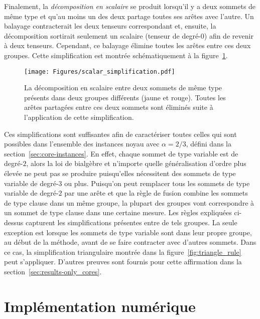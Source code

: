 Finalement, la \emph{décomposition en scalaire} se produit lorsqu'il y a deux sommets de même type et qu'au moins un des deux partage toutes ses arêtes avec l'autre.
Un balayage contracterait les deux tenseurs correspondant et, ensuite, la décomposition sortirait seulement un scalaire (tenseur de degré-$0$) afin de revenir à deux tenseurs.
Cependant, ce balayage élimine toutes les arêtes entre ces deux groupes.
Cette simplification est montrée schématiquement à la figure~\ref{fig:scalar-decomposition}.
\begin{figure}[h]
    \centering
    \texttt{[image: Figures/scalar\_simplification.pdf]}
    \caption[Représentation graphique de la décomposition en scalaire entre deux sommets de même type présents dans deux groupes différents.]{La décomposition en scalaire entre deux sommets de même type présents dans deux groupes différents (jaune et rouge). Toutes les arêtes partagées entre ces deux sommets sont éliminés suite à l'application de cette simplification.}
    \label{fig:scalar-decomposition}
\end{figure}

Ces simplifications sont suffisantes afin de caractériser toutes celles qui sont possibles dans l'ensemble des instances noyau avec $\alpha = 2/3$, défini dans la section~\ref{sec:core-instances}.
En effet, chaque sommet de type variable est de degré-$2$, alors la loi de bialgèbre et n'importe quelle généralisation d'ordre plus élevée ne peut pas se produire puisqu'elles nécessitent des sommets de type variable de degré-$3$ ou plus.
Puisqu'on peut remplacer tous les sommets de type variable de degré-$2$ par une arête et que la règle de fusion combine les sommets de type clause dans un même groupe, la plupart des groupes vont correspondre à un sommet de type clause dans une certaine mesure.
Les règles expliquées ci-dessus capturent les simplifications présentes entre de tels groupes.
La seule exception est lorsque les sommets de type variable sont dans leur propre groupe, au début de la méthode, avant de se faire contracter avec d'autres sommets.
Dans ce cas, la simplification triangulaire montrée dans la figure~\ref{fig:triangle_rule} peut s'appliquer.
D'autres preuves sont fournis pour cette affirmation dans la section~\ref{sec:results-only_cores}.



\chapter{Implémentation numérique}\label{ch:numerical-implementation}

